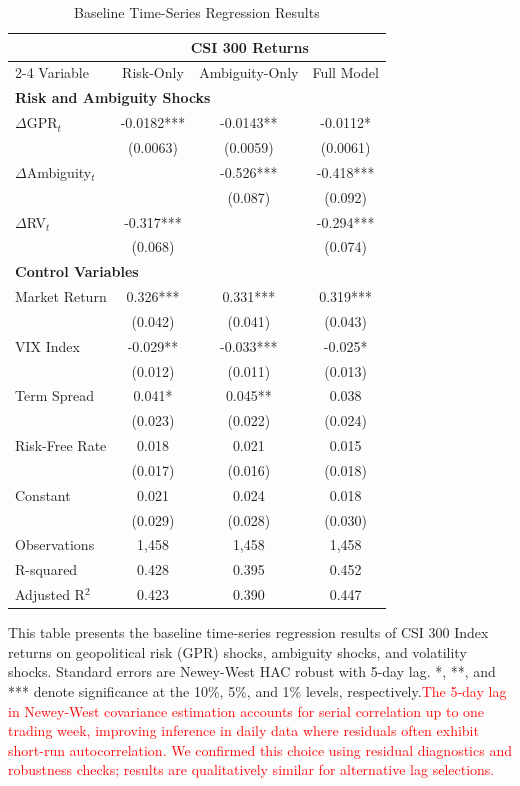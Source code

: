 \documentclass[preprint,12pt,authoryear]{elsarticle}
\begin{document}
\begin{table}[htbp]
\centering
\caption{Baseline Time-Series Regression Results}
\label{tab:baseline_ts}
\begin{threeparttable}
\begin{tabular*}{\textwidth}{@{\extracolsep{\fill}} lccc @{\extracolsep{\fill}}}
\toprule
& \multicolumn{3}{c}{CSI 300 Returns} \\
\cmidrule(lr){2-4}
Variable & Risk-Only & Ambiguity-Only & Full Model \\
\midrule
\midrule
\multicolumn{4}{l}{\textbf{Risk and Ambiguity Shocks}} \\
$\Delta$GPR$_t$ & -0.0182*** & -0.0143** & -0.0112* \\
& (0.0063) & (0.0059) & (0.0061) \\
$\Delta$Ambiguity$_t$ &  & -0.526*** & -0.418*** \\
&  & (0.087) & (0.092) \\
$\Delta$RV$_t$ & -0.317*** &  & -0.294*** \\
& (0.068) &   & (0.074) \\
\midrule
\multicolumn{4}{l}{\textbf{Control Variables}} \\
Market Return & 0.326*** & 0.331*** & 0.319*** \\
& (0.042) & (0.041) & (0.043) \\
VIX Index & -0.029** & -0.033*** & -0.025* \\
& (0.012) & (0.011) & (0.013) \\
Term Spread & 0.041* & 0.045** & 0.038 \\
& (0.023) & (0.022) & (0.024) \\
Risk-Free Rate & 0.018 & 0.021 & 0.015 \\
& (0.017) & (0.016) & (0.018) \\
\midrule
Constant & 0.021 & 0.024 & 0.018 \\
& (0.029) & (0.028) & (0.030) \\
\midrule
Observations & 1,458 & 1,458 & 1,458 \\
R-squared & 0.428 & 0.395 & 0.452 \\
Adjusted R$^2$ & 0.423 & 0.390 & 0.447 \\
\bottomrule
\end{tabular*}
\begin{tablenotes}[flushleft]
\small
\item[] This table presents the baseline time-series regression results of CSI 300 Index returns on geopolitical risk (GPR) shocks, ambiguity shocks, and volatility shocks. Standard errors are Newey-West HAC robust with 5-day lag. *, **, and *** denote significance at the 10\%, 5\%, and 1\% levels, respectively.\textcolor{red}{The 5-day lag in Newey-West covariance estimation accounts for serial correlation up to one trading week, improving inference in daily data where residuals often exhibit short-run autocorrelation. We confirmed this choice using residual diagnostics and robustness checks; results are qualitatively similar for alternative lag selections.}
\end{tablenotes}
\end{threeparttable}
\end{table}
\end{document}
